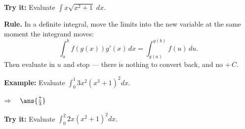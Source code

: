 \documentclass[12pt]{article}
\begin{document}
\begin{tryitbox}
\textbf{Try it:} \quad Evaluate $\displaystyle\int x\sqrt{x^2+1}\;dx$.\\[2pt]
\end{tryitbox}


\begin{formulabox}
\textbf{Rule.} In a definite integral, move the limits into the new variable at
the same moment the integrand moves:
\[ \int_a^b f(g(x))g'(x)\,dx = \int_{g(a)}^{g(b)} f(u)\,du . \]
Then evaluate in $u$ and stop --- there is nothing to convert back, and no
$+\,C$.
\end{formulabox}

\begin{examplebox}
\textbf{Example:} \quad Evaluate $\displaystyle\int_0^1 3x^2\left(x^3+1\right)^2dx$.

$\Rightarrow\quad \ans{\tfrac{7}{3}}$
\end{examplebox}

\begin{tryitbox}
\textbf{Try it:} \quad Evaluate $\displaystyle\int_0^2 2x\left(x^2+1\right)^2dx$.\\[2pt]
\end{tryitbox}
\end{document}
